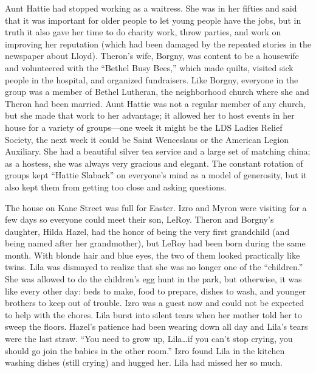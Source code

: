 \documentclass[
  letterpaper,
]{book}
\begin{document}
Aunt Hattie had stopped working as a waitress. She was in her fifties
and said that it was important for older people to let young people have
the jobs, but in truth it also gave her time to do charity work, throw
parties, and work on improving her reputation (which had been damaged by
the repeated stories in the newspaper about Lloyd). Theron's wife,
Borgny, was content to be a housewife and volunteered with the ``Bethel
Busy Bees,'' which made quilts, visited sick people in the hospital, and
organized fundraisers. Like Borgny, everyone in the group was a member
of Bethel Lutheran, the neighborhood church where she and Theron had
been married. Aunt Hattie was not a regular member of any church, but
she made that work to her advantage; it allowed her to host events in
her house for a variety of groups---one week it might be the LDS Ladies
Relief Society, the next week it could be Saint Wenceslaus or the
American Legion Auxiliary. She had a beautiful silver tea service and a
large set of matching china; as a hostess, she was always very gracious
and elegant. The constant rotation of groups kept ``Hattie Slaback'' on
everyone's mind as a model of generosity, but it also kept them from
getting too close and asking questions.

The house on Kane Street was full for Easter. Izro and Myron were
visiting for a few days so everyone could meet their son, LeRoy. Theron
and Borgny's daughter, Hilda Hazel, had the honor of being the very
first grandchild (and being named after her grandmother), but LeRoy had
been born during the same month. With blonde hair and blue eyes, the two
of them looked practically like twins. Lila was dismayed to realize that
she was no longer one of the ``children.'' She was allowed to do the
children's egg hunt in the park, but otherwise, it was like every other
day: beds to make, food to prepare, dishes to wash, and younger brothers
to keep out of trouble. Izro was a guest now and could not be expected
to help with the chores. Lila burst into silent tears when her mother
told her to sweep the floors. Hazel's patience had been wearing down all
day and Lila's tears were the last straw. ``You need to grow up,
Lila\ldots if you can't stop crying, you should go join the babies in
the other room.'' Izro found Lila in the kitchen washing dishes (still
crying) and hugged her. Lila had missed her so much.
\end{document}
